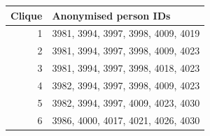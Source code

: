 \begin{tabular}{rl}
\toprule
Clique & Anonymised person IDs \\
\midrule
1 & 3981, 3994, 3997, 3998, 4009, 4019 \\
2 & 3981, 3994, 3997, 3998, 4009, 4023 \\
3 & 3981, 3994, 3997, 3998, 4018, 4023 \\
4 & 3982, 3994, 3997, 3998, 4009, 4023 \\
5 & 3982, 3994, 3997, 4009, 4023, 4030 \\
6 & 3986, 4000, 4017, 4021, 4026, 4030 \\
\bottomrule
\end{tabular}
